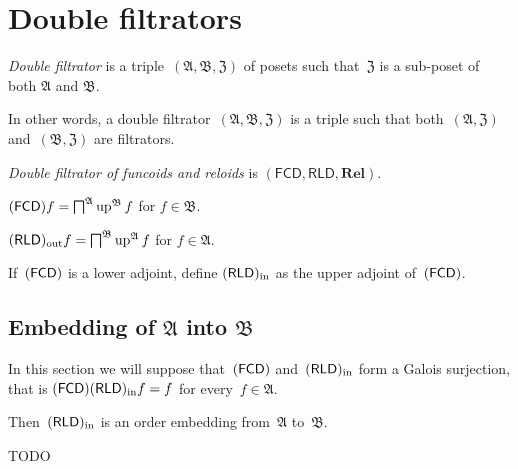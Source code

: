 \chapter{Double filtrators}

\begin{defn}
 \emph{Double filtrator} is a triple~$(\mathfrak{A},\mathfrak{B},\mathfrak{Z})$ of posets such that~$\mathfrak{Z}$ is a sub-poset of both $\mathfrak{A}$ and $\mathfrak{B}$.
\end{defn}

In other words, a double filtrator~$(\mathfrak{A},\mathfrak{B},\mathfrak{Z})$ is a triple such that both~$(\mathfrak{A},\mathfrak{Z})$ and~$(\mathfrak{B},\mathfrak{Z})$ are filtrators.

\begin{defn}
 \emph{Double filtrator of funcoids and reloids} is
 $(\mathsf{FCD},\mathsf{RLD},\mathbf{Rel})$.
\end{defn}

\begin{defn}
 $(\mathsf{FCD}) f = \bigsqcap^{\mathfrak{A}}\operatorname{up}^{\mathfrak{B}} f$ for $f\in\mathfrak{B}$.
\end{defn}

\begin{defn}
 $(\mathsf{RLD})_{\mathrm{out}} f = \bigsqcap^{\mathfrak{B}}\operatorname{up}^{\mathfrak{A}} f$ for $f\in\mathfrak{A}$.
\end{defn}

\begin{defn}
 If~$(\mathsf{FCD})$ is a lower adjoint, define $(\mathsf{RLD})_{\mathrm{in}}$ as the
 upper adjoint of~$(\mathsf{FCD})$.
\end{defn}

\section{Embedding of $\mathfrak{A}$ into $\mathfrak{B}$}

In this section we will suppose that~$(\mathsf{FCD})$ and~$(\mathsf{RLD})_{\mathrm{in}}$
form a Galois surjection, that is $(\mathsf{FCD})(\mathsf{RLD})_{\mathrm{in}} f = f$
for every~$f\in\mathfrak{A}$.

Then~$(\mathsf{RLD})_{\mathrm{in}}$ is an order embedding from~$\mathfrak{A}$
to~$\mathfrak{B}$.

TODO
